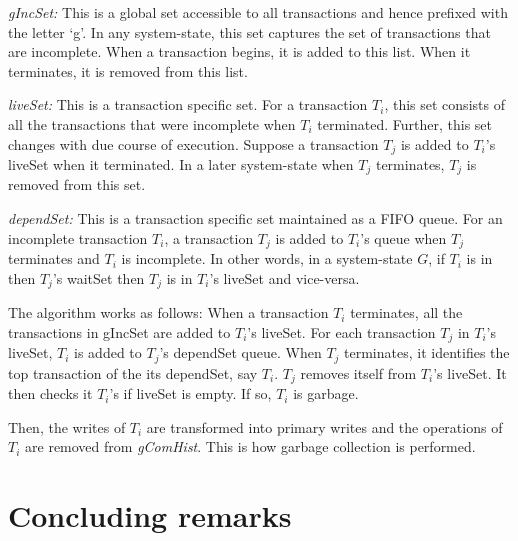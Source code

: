 \documentclass{llncs}
\newcommand{\cmnt}[1]{}
\newcommand{\op} {operation}
\newcommand{\gchist} {\textit{gComHist}}
\newcommand{\liveset} {liveSet}
\newcommand{\primary} {primary}
\newcommand{\glset} {gIncSet}
\newcommand{\waits} {waitSet}
\newcommand{\dset} {dependSet}
\newcommand{\sstate} {system-state}
\begin{document}
{\vspace{1mm}
\noindent
\textit{\glset:} This is a global set accessible to all transactions and hence prefixed with the letter `g'. In any \sstate{}, this set captures the set of transactions that are incomplete. When a transaction begins, it is added to this list. When it terminates, it is removed from this list. 

\vspace{1mm}
\noindent
\textit{\liveset:} This is a transaction specific set. For a transaction $T_i$, this set consists of all the transactions that were incomplete when $T_i$ terminated. Further, this set changes with due course of execution. Suppose a transaction $T_j$ is added to $T_i$'s \liveset{} when it terminated. In a later \sstate{} when $T_j$ terminates, $T_j$ is removed from this set. 

\cmnt { 
\vspace{1mm}
\noindent
\textit{\waits:} This is a transaction specific set. For a transaction $T_i$ in a given \sstate{} $G$, this set consists of all the transactions in its \liveset{} that are still incomplete. Thus this set is the intersection of $T_i$'s \liveset{} and \glset{} in $G$.
}

\vspace{1mm}
\noindent
\textit{\dset:} This is a transaction specific set maintained as a FIFO queue. For an incomplete transaction $T_i$, a transaction $T_j$ is added to $T_i$'s queue when $T_j$ terminates and $T_i$ is incomplete. In other words, in a \sstate{} $G$, if $T_i$ is in then $T_j$'s \waits{} then $T_j$ is in $T_i$'s \liveset{} and vice-versa. 

The algorithm works as follows: When a transaction $T_i$ terminates, all the transactions in \glset{} are added to $T_i$'s \liveset. For each transaction $T_j$ in $T_i$'s \liveset{}, $T_i$ is added to $T_j$'s \dset{} queue. When $T_j$ terminates, it identifies the top transaction of the its \dset, say $T_i$. $T_j$ removes itself from $T_i$'s \liveset. It then checks it $T_i$'s if \liveset{} is empty. If so, $T_i$ is garbage. 

Then, the writes of $T_i$ are transformed into \primary{} writes and the \op{s} of $T_i$ are removed from \gchist. This is how garbage collection is performed. 
}



\section{Concluding remarks}
\label{sec:conc}
\end{document}
